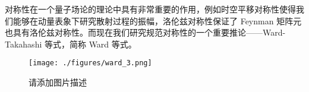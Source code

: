 
对称性在一个量子场论的理论中具有非常重要的作用，例如时空平移对称性使得我们能够在动量表象下研究散射过程的振幅，洛伦兹对称性保证了 Feynman 矩阵元也具有洛伦兹对称性。而现在我们研究规范对称性的一个重要推论——Ward-Takahashi 等式，简称 Ward 等式。
\begin{figure}[ht]
\centering
\texttt{[image: ./figures/ward\_3.png]}
\caption{请添加图片描述} \label{ward_fig3}
\end{figure}

